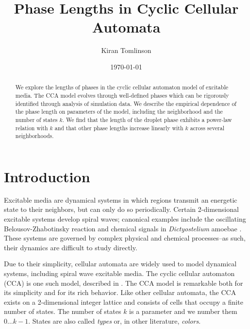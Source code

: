 \documentclass[%
 amsmath,amssymb,
 aps,
]{revtex4-1}
\begin{document}

\title{Phase Lengths in Cyclic Cellular Automata}%

\author{Kiran Tomlinson}
%

\date{\today}%

\begin{abstract}
We explore the lengths of phases in the cyclic cellular automaton model of excitable media. The CCA model evolves through well-defined phases which can be rigorously identified through analysis of simulation data. We describe the empirical dependence of the phase length on parameters of the model, including the neighborhood and the number of states $k$. We find that the length of the droplet phase exhibits a power-law relation with $k$ and that other phase lengths increase linearly with $k$ across several neighborhoods.  
\end{abstract}

\maketitle


\section{\label{sec:intro}Introduction}
Excitable media are dynamical systems in which regions transmit an energetic state to their neighbors, but can only do so periodically. Certain 2-dimensional excitable systems develop spiral waves; canonical examples include the oscillating Belousov-Zhabotinsky reaction \cite{Keener1986} and chemical signals in \emph{Dictyostelium} amoebae \cite{Palsson1997}. These systems are governed by complex physical and chemical processes--as such, their dynamics are difficult to study directly.

Due to their simplicity, cellular automata are widely used to model dynamical systems, including spiral wave excitable media. The cyclic cellular automaton (CCA) is one such model, described in \cite{Fisch1991}. The CCA model is remarkable both for its simplicity and for its rich behavior. Like other cellular automata, the CCA exists on a 2-dimensional integer lattice and consists of cells that occupy a finite number of states. The number of states $k$ is a parameter and we number them $0 \dots k-1$. States are also called \emph{types} or, in other literature, \emph{colors}.
\end{document}
